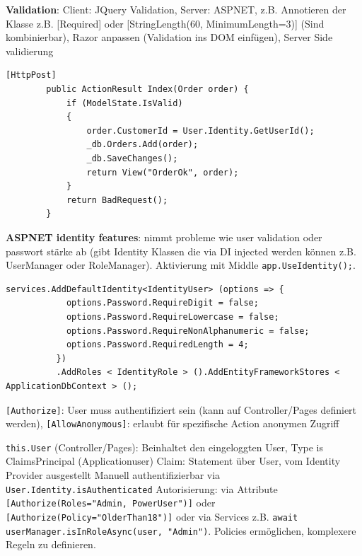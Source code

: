 \documentclass[10pt,landscape]{article}
\begin{document}
\begin{multicols}{2}
        \textbf{Validation}: Client: JQuery Validation, Server: ASPNET, z.B. Annotieren der Klasse z.B. [Required] oder [StringLength(60, MinimumLength=3)] (Sind kombinierbar), Razor anpassen (Validation ins DOM einfügen), Server Side validierung

        \begin{lstlisting}[style=CSharp]
        [HttpPost]
        public ActionResult Index(Order order) {
            if (ModelState.IsValid)
            {
                order.CustomerId = User.Identity.GetUserId();
                _db.Orders.Add(order);
                _db.SaveChanges();
                return View("OrderOk", order);
            }
            return BadRequest();
        }
        \end{lstlisting}

        \textbf{ASPNET identity features}: nimmt probleme wie user validation oder passwort stärke ab (gibt Identity Klassen die via DI injected werden können z.B. UserManager oder RoleManager).
        Aktivierung mit Middle \lstinline{app.UseIdentity();}.

        \begin{lstlisting}[style=CSharp]
        services.AddDefaultIdentity<IdentityUser> (options => {
            options.Password.RequireDigit = false;
            options.Password.RequireLowercase = false;
            options.Password.RequireNonAlphanumeric = false;
            options.Password.RequiredLength = 4;
          })
          .AddRoles < IdentityRole > ().AddEntityFrameworkStores < ApplicationDbContext > ();
        \end{lstlisting}

        \lstinline{[Authorize]}: User muss authentifiziert sein (kann auf Controller/Pages definiert werden), \lstinline{[AllowAnonymous]}: erlaubt für spezifische Action anonymen Zugriff

        \lstinline{this.User} (Controller/Pages): Beinhaltet den eingeloggten User, Type is ClaimsPrincipal (Applicationuser)
        Claim: Statement über User, vom Identity Provider ausgestellt
        Manuell authentifizierbar via \lstinline{User.Identity.isAuthenticated}
        Autorisierung: via Attribute \lstinline{[Authorize(Roles="Admin, PowerUser")]} oder \lstinline{[Authorize(Policy="OlderThan18")]} oder via Services z.B. \lstinline{await userManager.isInRoleAsync(user, "Admin")}.
        Policies ermöglichen, komplexere Regeln zu definieren.


\end{multicols}
\end{document}
